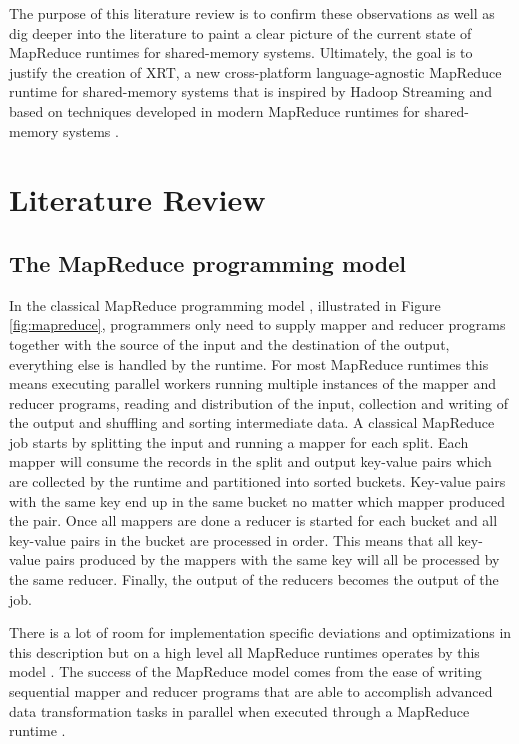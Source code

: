 \documentclass[11pt]{article}       %
\begin{document}
The purpose of this literature review is to confirm these observations as well as
dig deeper into the literature to paint a clear picture of the current state of
MapReduce runtimes for shared-memory systems. Ultimately, the goal is to justify the
creation of XRT, a new cross-platform language-agnostic MapReduce runtime for
shared-memory systems that is inspired by Hadoop Streaming
\cite{HadoopStreaming} and based on techniques developed in modern MapReduce
runtimes for shared-memory systems \cite{Phoenix} \cite{Phoenix++} \cite{CilkMR}
\cite{Ostrich} \cite{Metis}.

\section{Literature Review} \label{litrev}

\subsection{The MapReduce programming model}



In the classical MapReduce programming model \cite{GoogleMapReduce}, illustrated in
Figure \ref{fig:mapreduce}, programmers only need to supply mapper
and reducer programs together with the source of the input and the destination
of the output, everything else is handled by the runtime. For most MapReduce
runtimes this means executing parallel workers running multiple instances of the
mapper and reducer programs, reading and distribution of the input, collection
and writing of the output and shuffling and sorting intermediate data. A
classical MapReduce job starts by splitting the input and running a mapper for
each split. Each mapper will consume the records in the split and output
key-value pairs which are collected by the runtime and partitioned into sorted
buckets. Key-value pairs with the same key end up in the same bucket no
matter which mapper produced the pair. Once all mappers are done a reducer is
started for each bucket and all key-value pairs in the bucket are processed in
order. This means that all key-value pairs produced
by the mappers with the same key will all be processed by the same reducer. Finally,
the output of the reducers becomes the output of the job.

There is a lot of room
for implementation specific deviations and optimizations in this description but on
a high level all MapReduce runtimes operates by this model \cite{GoogleMapReduce}
\cite{Hadoop} \cite{Phoenix} \cite{Phoenix++} \cite{CilkMR} \cite{Metis}
\cite{Ostrich}. The success of the MapReduce model comes from the ease of writing
sequential mapper and reducer programs that are able to accomplish advanced
data transformation tasks in parallel when executed through a MapReduce runtime
\cite{GoogleMapReduce}.
\end{document}
